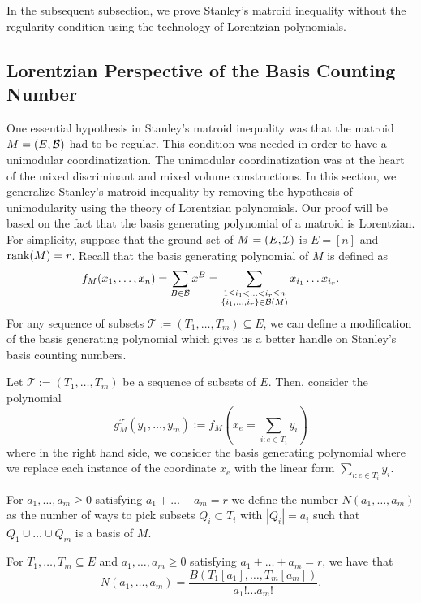 \documentclass{puthesis-UG}
\begin{document}
In the subsequent subsection, we prove Stanley's matroid inequality without the regularity condition using the technology of Lorentzian polynomials. 



\subsection{Lorentzian Perspective of the Basis Counting Number} \label{subsection-matroid-lorentzian-stanley-general}

One essential hypothesis in Stanley's matroid inequality was that the matroid $M = (E, \mathcal{B})$ had to be regular. This condition was needed in order to have a unimodular coordinatization. The unimodular coordinatization was at the heart of the mixed discriminant and mixed volume constructions. In this section, we generalize Stanley's matroid inequality by removing the hypothesis of unimodularity using the theory of Lorentzian polynomials. Our proof will be based on the fact that the basis generating polynomial of a matroid is Lorentzian. For simplicity, suppose that the ground set of $M = (E, \mathcal{I})$ is $E = [n]$ and $\operatorname{rank} (M) = r$. Recall that the basis generating polynomial of $M$ is defined as 
\[
	f_M(x_1, \ldots, x_n) = \sum_{B \in \mathcal{B}} x^B = \sum_{\substack{1 \leq i_1 < \ldots < i_r \leq n \\ \{i_1, \ldots, i_r\} \in \mathcal{B} (M)}} x_{i_1} \ldots x_{i_r}.
\]
For any sequence of subsets $\mathcal{T} := (T_1, \ldots, T_m) \subseteq E$, we can define a modification of the basis generating polynomial which gives us a better handle on Stanley's basis counting numbers. 

\begin{defn}
	Let $\mathcal{T} := (T_1, \ldots, T_m)$ be a sequence of subsets of $E$. Then, consider the polynomial 
	\[
		g_M^\mathcal{T} (y_1, \ldots, y_m) := f_M \left (x_e = \sum_{i : e \in T_i} y_i \right )
	\]
	where in the right hand side, we consider the basis generating polynomial where we replace each instance of the coordinate $x_e$ with the linear form $\sum_{i : e \in T_i} y_i$. 
\end{defn}

For $a_1, \ldots, a_m \geq 0$ satisfying $a_1 + \ldots + a_m = r$ we define the number $N(a_1, \ldots, a_m)$ as the number of ways to pick subsets $Q_i \subset T_i$ with $|Q_i| = a_i$ such that $Q_1 \cup \ldots \cup Q_m$ is a basis of $M$. 
\begin{lem} \label{lem-simplifying-N-to-B}
	For $T_1, \ldots, T_m \subseteq E$ and $a_1, \ldots, a_m \geq 0$ satisfying $a_1 + \ldots + a_m = r$, we have that 
	\[	
		N(a_1, \ldots, a_m) = \frac{B(T_1[a_1], \ldots, T_m[a_m])}{a_1! \ldots a_m!}.
	\]
\end{lem}
\end{document}
